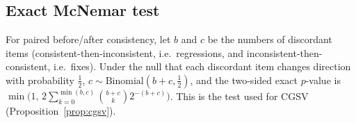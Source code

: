 \documentclass[pdflatex,sn-nature]{sn-jnl}
\begin{document}
\subsection{Exact McNemar test}
For paired before/after consistency, let $b$ and $c$ be the numbers of discordant items
(consistent-then-inconsistent, i.e.\ regressions, and inconsistent-then-consistent,
i.e.\ fixes). Under the null that each discordant item changes direction with
probability $\tfrac12$, $c\sim\mathrm{Binomial}(b+c,\tfrac12)$, and the two-sided exact
$p$-value is $\min\!\big(1,\,2\sum_{k=0}^{\min(b,c)}\binom{b+c}{k}2^{-(b+c)}\big)$. This
is the test used for CGSV (Proposition~\ref{prop:cgsv}).



\end{document}
